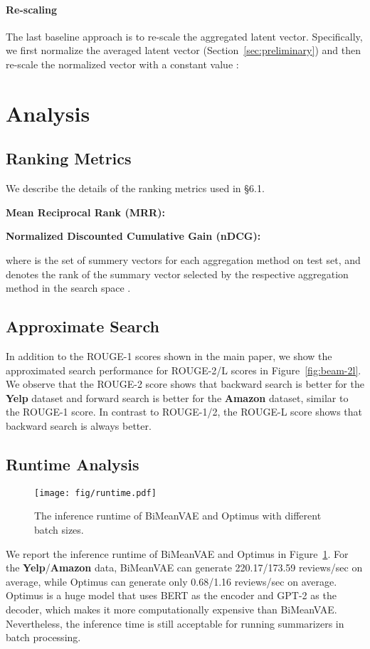 \documentclass[11pt]{article}
\newcommand{\name}{\mbox{\sc BiMeanVAE}}
\newcommand{\yelp}{\mbox{\bf Yelp}}
\newcommand{\amazon}{\mbox{\bf Amazon}}
\begin{document}
\paragraph{Re-scaling}
The last baseline approach is to re-scale the aggregated latent vector. Specifically, we first normalize the averaged latent vector  (Section~\ref{sec:preliminary}) and then re-scale the normalized vector with a constant value :


\section{Analysis}
\subsection{Ranking Metrics} \label{app:rank_metrics}
We describe the details of the ranking metrics used in \S 6.1.

\noindent
{\bf Mean Reciprocal Rank (MRR):}

{\bf Normalized Discounted Cumulative Gain (nDCG):}

where  is the set of summery vectors for each aggregation method on test set, and  denotes the rank of the summary vector  selected by the respective aggregation method in the search space .

\subsection{Approximate Search}
\label{app:beam-2l}
In addition to the ROUGE-1 scores shown in the main paper, we show the approximated search performance for ROUGE-2/L scores in Figure~\ref{fig:beam-2l}.
We observe that the ROUGE-2 score shows that backward search is better for the \yelp{} dataset and forward search is better for the \amazon{} dataset, similar to the ROUGE-1 score.
In contrast to ROUGE-1/2, the ROUGE-L score shows that backward search is always better.

\subsection{Runtime Analysis}
\label{app:runtime}
\begin{figure}[t]
    \centering
    \texttt{[image: fig/runtime.pdf]}
    \caption{The inference runtime of \name{} and Optimus with different batch sizes.}
    \label{fig:runtime}
\end{figure}
We report the inference runtime of \name{} and Optimus in Figure~\ref{fig:runtime}.
For the \yelp{}/\amazon{} data, \name{} can generate 220.17/173.59 reviews/sec on average, while Optimus can generate only 0.68/1.16 reviews/sec on average.
Optimus is a huge model that uses BERT as the encoder and GPT-2 as the decoder, which makes it more computationally expensive than \name.
Nevertheless, the inference time is still acceptable for running summarizers in batch processing. 
\end{document}
